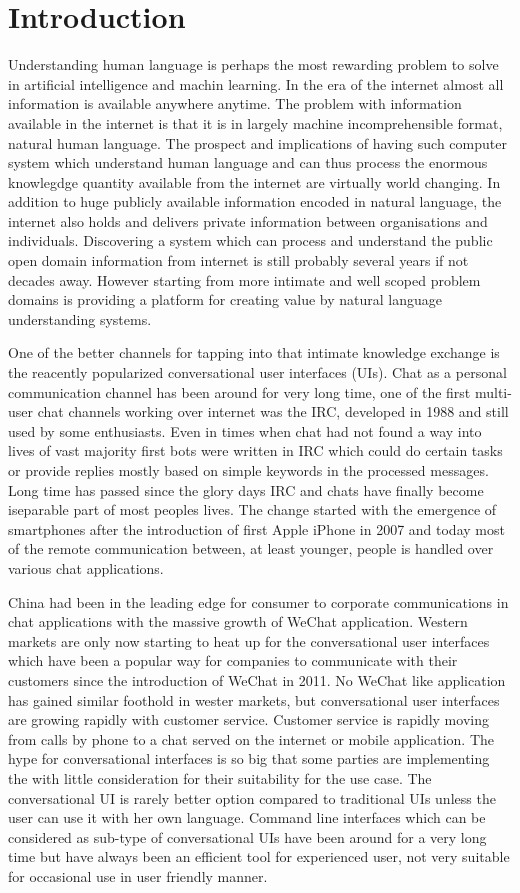 \documentclass[12pt,a4paper,english
]{tutthesis}
\begin{document}
\chapter{Introduction}
\label{ch:intro}
Understanding human language is perhaps the most rewarding problem to solve in artificial intelligence and machin learning. In the era of the internet almost all information is available anywhere anytime. The problem with information available in the internet is that it is in largely machine incomprehensible format, natural human language. The prospect and implications of having such computer system which understand human language and can thus process the enormous knowlegdge quantity available from the internet are  virtually world changing. In addition to huge publicly available information encoded in natural language, the internet also holds and delivers private information between organisations and individuals. Discovering a system which can process and understand the public open domain information from internet is still probably several years if not decades away. However starting from more intimate and well scoped problem domains is providing a platform for creating value by natural language understanding systems.

One of the better channels for tapping into that intimate knowledge exchange is the reacently popularized conversational user interfaces (UIs). Chat as a personal communication channel has been around for very long time, one of the first multi-user chat channels working over internet was the IRC, developed in 1988 and still used by some enthusiasts. Even in times when chat had not found a way into lives of vast majority first bots were written in IRC which could do certain tasks or provide replies mostly based on simple keywords in the processed messages. Long time has passed since the glory days IRC and chats have finally become iseparable part of most peoples lives. The change started with the emergence of smartphones after the introduction of first Apple iPhone in 2007 and today most of the remote communication between, at least younger, people is handled over various chat applications.

China had been in the leading edge for consumer to corporate communications in chat applications with the massive growth of WeChat application. Western markets are only now starting to heat up for the conversational user interfaces which have been a popular way for companies to communicate with their customers since the introduction of WeChat in 2011. No WeChat like application has gained similar foothold in wester markets, but conversational user interfaces are growing rapidly with customer service. Customer service is rapidly moving from calls by phone to a chat served on the internet or mobile application. The hype for conversational interfaces is so big that some parties are implementing the with little consideration for their suitability for the use case. The conversational UI is rarely better option compared to traditional UIs unless the user can use it with her own language. Command line interfaces which can be considered as sub-type of conversational UIs have been around for a very long time but have always been an efficient tool for experienced user, not very suitable for occasional use in user friendly manner.
\end{document}
